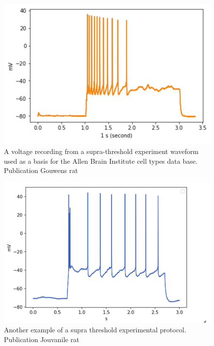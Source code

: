 



\begin{figure}
    \begin{center}
    \includegraphics[width=0.6\linewidth]{figures/multi_spiking_large_allen}
    \caption{A voltage recording from a supra-threshold experiment waveform used as a basis for the Allen Brain Institute cell types data base. Publication Gouwens rat \citep{gouwens2018systematic}}
    \label{fig:adaptionm}
    \end{center}
\end{figure}    

\begin{figure}  
    \begin{center}
    \includegraphics[width=0.6\linewidth]{figures/multi_spiking_large_bbp}
    \caption{Another example of a supra threshold experimental protocol. Publication Jouvanile rat \citep{toledo}}
    \label{fig:bbp_trace_adaption_late_spike}
    \end{center}
\end{figure}    

